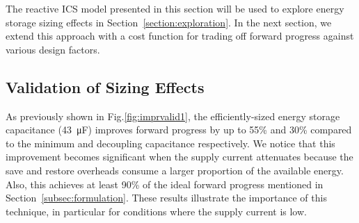 




The reactive ICS model presented in this section will be used to explore energy storage sizing effects in Section~\ref{section:exploration}. In the next section, we extend this approach with a cost function for trading off forward progress against various design factors. 


\subsection{Validation of Sizing Effects}

As previously shown in Fig.\ref{fig:imprvalid1}, the efficiently-sized energy storage capacitance (\SI{43}{\micro\farad}) improves forward progress by up to 55\% and 30\% compared to the minimum and decoupling capacitance respectively. We notice that this improvement becomes significant when the supply current attenuates because the save and restore overheads consume a larger proportion of the available energy. Also, this achieves at least 90\% of the ideal forward progress mentioned in Section~\ref{subsec:formulation}. 
These results illustrate the importance of this technique, in particular for conditions where the supply current is low.